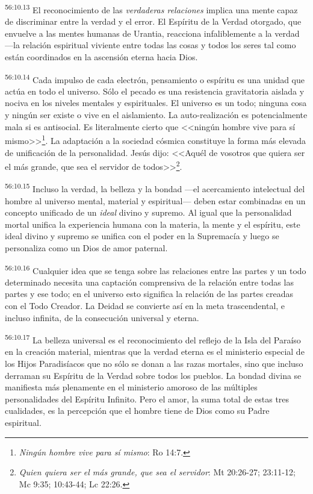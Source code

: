 \par
\textsuperscript{56:10.13} El reconocimiento de las \textit{verdaderas relaciones} implica una mente capaz de discriminar entre la verdad y el error. El Espíritu de la Verdad otorgado, que envuelve a las mentes humanas de Urantia, reacciona infaliblemente a la verdad ---la relación espiritual viviente entre todas las cosas y todos los seres tal como están coordinados en la ascensión eterna hacia Dios.

\par
\textsuperscript{56:10.14} Cada impulso de cada electrón, pensamiento o espíritu es una unidad que actúa en todo el universo. Sólo el pecado es una resistencia gravitatoria aislada y nociva en los niveles mentales y espirituales. El universo es un todo; ninguna cosa y ningún ser existe o vive en el aislamiento. La auto-realización es potencialmente mala si es antisocial. Es literalmente cierto que <<ningún hombre vive para sí mismo>>\footnote{\textit{Ningún hombre vive para sí mismo}: Ro 14:7.}. La adaptación a la sociedad cósmica constituye la forma más elevada de unificación de la personalidad. Jesús dijo: <<Aquél de vosotros que quiera ser el más grande, que sea el servidor de todos>>\footnote{\textit{Quien quiera ser el más grande, que sea el servidor}: Mt 20:26-27; 23:11-12; Mc 9:35; 10:43-44; Lc 22:26.}.

\par
\textsuperscript{56:10.15} Incluso la verdad, la belleza y la bondad ---el acercamiento intelectual del hombre al universo mental, material y espiritual--- deben estar combinadas en un concepto unificado de un \textit{ideal} divino y supremo. Al igual que la personalidad mortal unifica la experiencia humana con la materia, la mente y el espíritu, este ideal divino y supremo se unifica con el poder en la Supremacía y luego se personaliza como un Dios de amor paternal.

\par
\textsuperscript{56:10.16} Cualquier idea que se tenga sobre las relaciones entre las partes y un todo determinado necesita una captación comprensiva de la relación entre todas las partes y ese todo; en el universo esto significa la relación de las partes creadas con el Todo Creador. La Deidad se convierte así en la meta trascendental, e incluso infinita, de la consecución universal y eterna.

\par
\textsuperscript{56:10.17} La belleza universal es el reconocimiento del reflejo de la Isla del Paraíso en la creación material, mientras que la verdad eterna es el ministerio especial de los Hijos Paradisíacos que no sólo se donan a las razas mortales, sino que incluso derraman su Espíritu de la Verdad sobre todos los pueblos. La bondad divina se manifiesta más plenamente en el ministerio amoroso de las múltiples personalidades del Espíritu Infinito. Pero el amor, la suma total de estas tres cualidades, es la percepción que el hombre tiene de Dios como su Padre espiritual.

